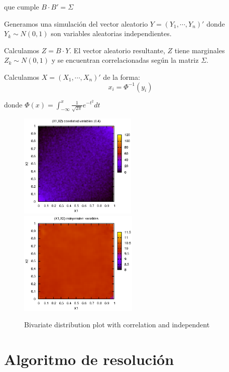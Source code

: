\noindent que cumple $B \cdot B' = \Sigma$

\noindent Generamos una simulaci\'on del vector aleatorio $Y=(Y_1, \cdots, Y_n)'$ 
donde $Y_k \sim N(0,1)$ son variables aleatorias independientes.

\noindent Calculamos $Z = B \cdot Y$. El vector aleatorio resultante, $Z$ tiene
marginales $Z_k \sim N(0,1)$ y se encuentran correlacionadas seg\'un la matriz 
$\Sigma$.

\noindent Calculamos $X = (X_1, \cdots, X_n)'$ de la forma:
\begin{displaymath}
x_i = \Phi^{-1}(y_i)
\end{displaymath}

\noindent donde $\Phi(x) = \int_{-\infty}^{x} \frac{1}{\sqrt{2 \pi}} e^{-t^2} dt$

\begin{figure}[!hb]
\begin{center}
\includegraphics[height=5cm, angle=0]{./images/copula.eps}
\includegraphics[height=5cm, angle=0]{./images/uniform.eps}
\caption{Bivariate distribution plot with correlation and independent}
\label{copulas}
\end{center}
\end{figure}


\section{Algoritmo de resoluci\'on}

